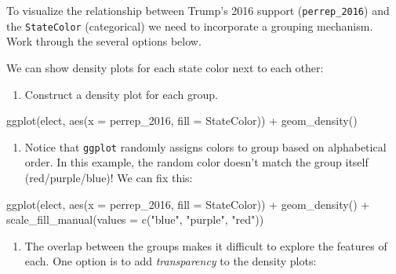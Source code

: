 \documentclass[
  letterpaper,
  DIV=11,
  numbers=noendperiod]{scrreprt}
\newenvironment{Shaded}{\begin{snugshade}}{\end{snugshade}}
\newcommand{\AttributeTok}[1]{\textcolor[rgb]{0.40,0.45,0.13}{#1}}
\newcommand{\FunctionTok}[1]{\textcolor[rgb]{0.28,0.35,0.67}{#1}}
\newcommand{\NormalTok}[1]{\textcolor[rgb]{0.00,0.23,0.31}{#1}}
\newcommand{\SpecialCharTok}[1]{\textcolor[rgb]{0.37,0.37,0.37}{#1}}
\newcommand{\StringTok}[1]{\textcolor[rgb]{0.13,0.47,0.30}{#1}}
\providecommand{\tightlist}{%
  \setlength{\itemsep}{0pt}\setlength{\parskip}{0pt}}\usepackage{longtable,booktabs,array}
\begin{document}
To visualize the relationship between Trump's 2016 support
(\texttt{perrep\_2016}) and the \texttt{StateColor} (categorical) we
need to incorporate a grouping mechanism. Work through the several
options below.

\begin{Shaded}
\begin{Highlighting}[]
\NormalTok{We can show density plots for each state color next to each other:}
\end{Highlighting}
\end{Shaded}

\begin{enumerate}
\def\labelenumi{\alph{enumi}.}
\tightlist
\item
  Construct a density plot for each group.
\end{enumerate}

\begin{Shaded}
\begin{Highlighting}[]
\FunctionTok{ggplot}\NormalTok{(elect, }\FunctionTok{aes}\NormalTok{(}\AttributeTok{x =}\NormalTok{ perrep\_2016, }\AttributeTok{fill =}\NormalTok{ StateColor)) }\SpecialCharTok{+}
  \FunctionTok{geom\_density}\NormalTok{()}
\end{Highlighting}
\end{Shaded}

\begin{enumerate}
\def\labelenumi{\alph{enumi}.}
\setcounter{enumi}{1}
\tightlist
\item
  Notice that \texttt{ggplot} randomly assigns colors to group based on
  alphabetical order. In this example, the random color doesn't match
  the group itself (red/purple/blue)! We can fix this:
\end{enumerate}

\begin{Shaded}
\begin{Highlighting}[]
\FunctionTok{ggplot}\NormalTok{(elect, }\FunctionTok{aes}\NormalTok{(}\AttributeTok{x =}\NormalTok{ perrep\_2016, }\AttributeTok{fill =}\NormalTok{ StateColor)) }\SpecialCharTok{+}
  \FunctionTok{geom\_density}\NormalTok{() }\SpecialCharTok{+}
  \FunctionTok{scale\_fill\_manual}\NormalTok{(}\AttributeTok{values =} \FunctionTok{c}\NormalTok{(}\StringTok{"blue"}\NormalTok{, }\StringTok{"purple"}\NormalTok{, }\StringTok{"red"}\NormalTok{))}
\end{Highlighting}
\end{Shaded}

\begin{enumerate}
\def\labelenumi{\alph{enumi}.}
\setcounter{enumi}{2}
\tightlist
\item
  The overlap between the groups makes it difficult to explore the
  features of each. One option is to add \emph{transparency} to the
  density plots:
\end{enumerate}
\end{document}
